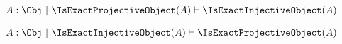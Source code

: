 
\begin{sequent}
\begin{align*}
  A:\Obj ~|~ \IsExactProjectiveObject( A ) \vdash \IsExactInjectiveObject( A )
\end{align*}
\end{sequent}

\begin{sequent}
\begin{align*}
  A:\Obj ~|~ \IsExactInjectiveObject( A ) \vdash \IsExactProjectiveObject( A )
\end{align*}
\end{sequent}

